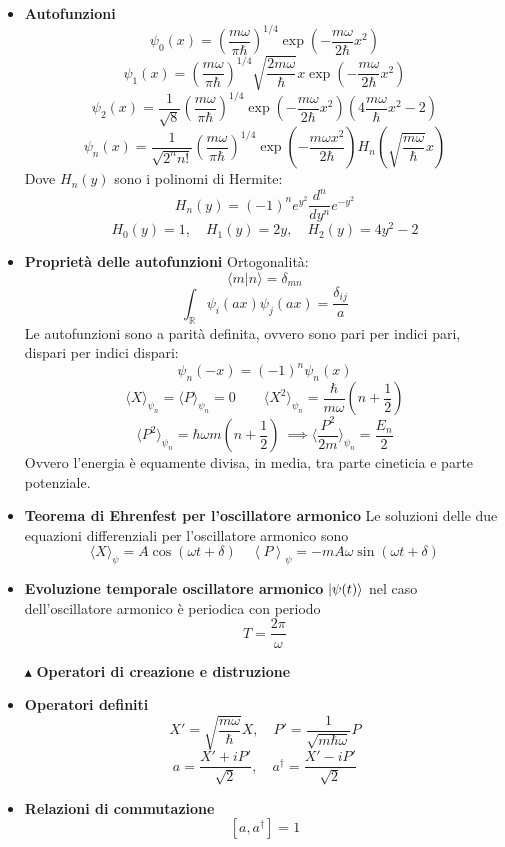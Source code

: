 \documentclass{book}
\newcommand{\g}{\textbf}
\newcommand{\e}{\begin{equation}}
\newcommand{\ex}{\end{equation} }
\renewcommand{\it}{\item[$\cdot$]}
\begin{document}
\begin{multicols}{4}
\begin{itemize}
    \it \g{Autofunzioni}
        \e{\psi_0(x) = \left(\frac{m\omega}{\pi\hbar}\right)^{1/4} \exp\left(-\frac{m\omega}{2\hbar}x^2\right)} \ex
        \e{\psi_1(x) = \left(\frac{m\omega}{\pi\hbar}\right)^{1/4} \sqrt{\frac{2m\omega}{\hbar}} x \exp\left(-\frac{m\omega}{2\hbar}x^2\right)} \ex
        \e{\psi_2(x) = \frac{1}{\sqrt{8}} \left(\frac{m\omega}{\pi\hbar}\right)^{1/4} \exp\left(-\frac{m\omega}{2\hbar}x^2\right)\left(4\frac{m\omega}{\hbar}x^2 - 2\right)} \ex
        \e{\psi_n(x) = \frac{1}{\sqrt{2^n n!}} \left(\frac{m\omega}{\pi\hbar}\right)^{1/4} \exp\left(-\frac{m\omega x^2}{2\hbar}\right) H_n\left(\sqrt{\frac{m\omega}{\hbar}} x\right)} \ex
        Dove $H_n(y)$ sono i polinomi di Hermite:
        \e{H_n(y) = (-1)^n e^{y^2} \frac{d^n}{dy^n} e^{-y^2}} \ex
        \e{H_0(y) = 1, \quad H_1(y) = 2y, \quad H_2(y) = 4y^2 - 2} \ex
        \it \g{Proprietà delle autofunzioni}
        Ortogonalità:
        \e{\langle m | n \rangle = \delta_{mn}} \ex
        \e{\int_{\mathbb{R}} \psi_i(ax) \psi_j(ax) = \frac{\delta_{ij}}{a}} \ex
     Le autofunzioni sono a parità definita, ovvero sono pari per indici pari, dispari per indici dispari:
     \e{\psi_{n}(-x) = (-1)^{n}\psi_{n}(x)}\ex
     \e{\langle X \rangle_{\psi_{n}} = \langle P \rangle_{\psi_{n}} = 0 \qquad \langle X^{2}\rangle_{\psi_{n}} = \frac{\hbar}{m \omega}(n + \frac{1}{2})}\ex
     \e{\langle P^{2}\rangle_{\psi_{n}} = \hbar \omega m (n + \frac{1}{2}) \ \implies \langle \frac{P^{2}}{2m}\rangle_{\psi_{n}} = \frac{E_{n}}{2}}\ex
     Ovvero l'energia è equamente divisa, in media, tra parte cineticia e parte potenziale. 

     \it \g{Teorema di Ehrenfest per l'oscillatore armonico}
     Le soluzioni delle due equazioni differenziali per l'oscillatore armonico sono 
     \e{\langle X \rangle_{\psi} = A\cos(\omega t + \delta) \quad \left\langle P \right\rangle_{\psi} = - m A \omega \sin(\omega t + \delta)}\ex
     \it \g{Evoluzione temporale oscillatore armonico}
    $\ket{\psi(t)}$ nel caso dell'oscillatore armonico è periodica con periodo 
    \e{T = \frac{2 \pi}{\omega}}\ex
    
\item [$\blacktriangle$] \g{Operatori di creazione e distruzione}
    \it \g{Operatori definiti}
        \e{X' = \sqrt{\frac{m\omega}{\hbar}} X, \quad P' = \frac{1}{\sqrt{m\hbar\omega}} P} \ex
        \e{a = \frac{X' + iP'}{\sqrt{2}}, \quad a^\dagger = \frac{X' - iP'}{\sqrt{2}}} \ex

    \it \g{Relazioni di commutazione}
        \e{[a, a^\dagger] = 1} \ex


\end{itemize}
\end{multicols}
\end{document}

